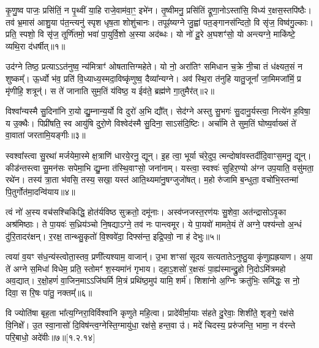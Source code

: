
कृ॒णु॒ष्व पाजः॒ प्रसि॑तिं॒ न पृ॒थ्वीं या॒हि राजे॒वाम॑वा॒ꣳ॒ इभे॑न। तृ॒ष्वीमनु॒ प्रसि॑तिं द्रूणा॒नोऽस्ता॑सि॒ विध्य॑ र॒क्षस॒स्तपि॑ष्ठैः। तव॑ भ्र॒मास॑ आशु॒या प॑त॒न्त्यनु॑ स्पृश धृष॒ता शोशु॑चानः। तपूꣴ॑ष्यग्ने जु॒ह्वा॑ पत॒ङ्गानस॑न्दितो॒ वि सृ॑ज॒ विष्व॑गु॒ल्काः। प्रति॒ स्पशो॒ वि सृ॑ज॒ तूर्णि॑तमो॒ भवा॑ पा॒युर्वि॒शो अ॒स्या अद॑ब्धः। यो नो॑ दू॒रे अ॒घशꣳ॑सो॒  यो अन्त्यग्ने॒ माकि॑ष्टे॒ व्यथि॒रा द॑धर्षीत्॥१॥

उद॑ग्ने तिष्ठ॒ प्रत्याऽऽत॑नुष्व॒ न्य॑मित्राꣳ॑ ओषतात्तिग्महेते। यो नो॒ अरा॑तिꣳ समिधान च॒क्रे नी॒चा तं ध॑क्ष्यत॒सं न शुष्कम्᳚। ऊ॒र्ध्वो भ॑व॒ प्रति॑ वि॒ध्याध्य॒स्मदा॒विष्कृ॑णुष्व॒ दैव्या᳚न्यग्ने। अव॑ स्थि॒रा त॑नुहि यातु॒जूनां᳚ जा॒मिमजा॑मिं॒ प्र मृ॑णीहि॒ शत्रून्॑। स ते॑ जानाति सुम॒तिं य॑विष्ठ॒ य ईव॑ते॒ ब्रह्म॑णे गा॒तुमैर॑त्॥२॥

विश्वा᳚न्यस्मै सु॒दिना॑नि रा॒यो द्यु॒म्नान्य॒र्यो वि दुरो॑ अ॒भि द्यौ᳚त्। सेद॑ग्ने अस्तु सु॒भगः॑ सु॒दानु॒र्यस्त्वा॒ नित्ये॑न ह॒विषा॒ य उ॒क्थैः। पिप्री॑षति॒ स्व आयु॑षि दुरो॒णे विश्वेद॑स्मै सु॒दिना॒ साऽस॑दि॒ष्टिः। अर्चा॑मि ते सुम॒तिं घोष्य॒र्वाख्सं ते॑ वा॒वाता॑ जरतामि॒यङ्गीः॥३॥
 
स्वश्वा᳚स्त्वा सु॒रथा॑ मर्जयेमा॒स्मे क्ष॒त्राणि॑ धारये॒रनु॒ द्यून्। इ॒ह त्वा॒ भूर्या च॑रे॒दुप॒ त्मन्दोषा॑\-वस्तर्दीदि॒वाꣳ\-स॒मनु॒ द्यून्। कीड॑न्तस्त्वा सु॒मन॑सः सपेमा॒भि द्यु॒म्ना त॑स्थि॒वाꣳसो॒ जना॑नाम्। यस्त्वा॒ स्वश्वः॑ सुहिर॒ण्यो अ॑ग्न उप॒याति॒ वसु॑मता॒ रथे॑न। तस्य॑ त्रा॒ता भ॑वसि॒ तस्य॒ सखा॒ यस्त॑ आति॒थ्यमा॑नु॒षग्जुजो॑षत्। म॒हो रु॑जामि ब॒न्धुता॒ वचो॑भि॒स्तन्मा॑ पि॒तुर्गोत॑मा॒दन्वि॑याय॥४॥

त्वं नो॑ अ॒स्य वच॑सश्चिकिद्धि॒ होत॑र्यविष्ठ सुक्रतो॒ दमू॑नाः। अस्व॑प्नजस्त॒रण॑यः सु॒शेवा॒ अत॑न्द्रासोऽवृ॒का अश्र॑मिष्ठाः। ते पा॒यवः॑ स॒ध्रिय॑ञ्चो नि॒षद्याऽग्ने॒ तव॑ नः पान्त्वमूर। ये पा॒यवो॑ मामते॒यं ते॑ अग्ने॒ पश्य॑न्तो अ॒न्धं दु॑रि॒तादर॑क्षन्। र॒रक्ष॒ तान्थ्सु॒कृतो॑ वि॒श्ववे॑दा॒ दिफ्स॑न्त॒ इद्रि॒पवो॒ ना ह॑ देभुः॥५॥
 
त्वया॑ व॒यꣳ स॑ध॒न्य॑स्त्वोता॒स्तव॒ प्रणी᳚त्यश्याम॒ वाजान्॑। उ॒भा शꣳसा॑ सूदय सत्यतातेऽनुष्ठु॒या कृ॑णुह्यह्रयाण। अ॒या ते॑ अग्ने स॒मिधा॑ विधेम॒ प्रति॒ स्तोमꣳ॑ श॒स्यमा॑नं गृभाय। दहा॒ऽ॒शसो॑ र॒क्षसः॑ पा॒ह्य॑स्मान्द्रु॒हो नि॒दोऽमि॑त्रमहो अव॒द्यात्। र॒क्षो॒हणं॑ वा॒जिन॒माऽऽजि॑घर्मि मि॒त्रं प्रथि॑ष्ठ॒मुप॑ यामि॒ शर्म॑। शिशा॑नो अ॒ग्निः क्रतु॑भिः॒ समि॑द्धः॒ स नो॒ दिवा॒ स रि॒षः पा॑तु॒ नक्तम्᳚॥६॥

 वि ज्योति॑षा बृह॒ता भा᳚त्य॒ग्निरा॒विर्विश्वा॑नि कृणुते महि॒त्वा। प्रादे॑वीर्मा॒याः स॑हते दु॒रेवाः॒ शिशी॑ते॒ शृङ्गे॒ रक्ष॑से वि॒निक्षे᳚। उ॒त स्वा॒नासो॑ दि॒विष॑न्त्व॒ग्नेस्ति॒ग्मायु॑धा॒ रक्ष॑से॒ हन्त॒वा उ॑। मदे॑ चिदस्य॒ प्ररु॑जन्ति॒ भामा॒ न व॑रन्ते परि॒बाधो॒ अदे॑वीः॥७॥[१.२.१४]

